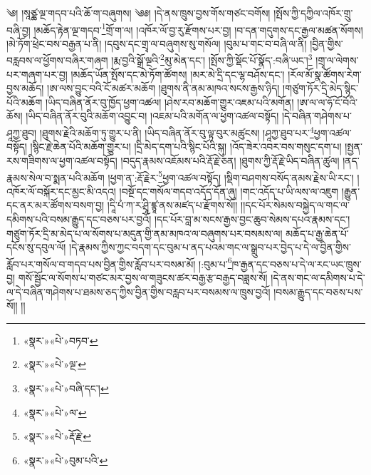 ༄། །སཱཙྪ་ལྔ་གདབ་པའི་ཆོ་ག་བཞུགས། ༄༅། །དེ་ནས་ཁྲུས་བྱས་གོས་གཙང་བགོས། །སྤོས་ཀྱི་དཀྱིལ་འཁོར་གྲུ་བཞི་བྱ། །མཆོད་རྟེན་ལྔ་གདབ་\footnote{«སྣར་»«པེ་»བཏབ་}གྲོ་ག་ལ། །འཁོར་ལོ་བྱ་རུ་རྫོགས་པར་བྱ། །བ་དན་གདུགས་དང་རྒྱལ་མཚན་སོགས། །མེ་ཏོག་ཕྲེང་བས་བརྒྱན་པ་ནི། །དབུས་དང་གྲྭ་ལ་བཞུགས་སུ་གསོལ། །བུམ་པ་གང་བ་བཞི་ལ་ནི། །བྱིན་གྱིས་བརླབས་ལ་ཕྱོགས་བཞིར་གཞག །རྨ་བྱའི་སྒྲོ་ལྔའི་\footnote{«སྣར་»«པེ་»ལྔ་}མུ་མེན་དང་། །སྤོས་ཀྱི་སྡོང་པོ་སྣོད་:བཞི་ཡང་།\footnote{«སྣར་»«པེ་»བཞི་དང་།} །གྲྭ་ལ་ལེགས་པར་གཞག་པར་བྱ། །མཆོད་ཡོན་སྤོས་དང་མེ་ཏོག་ཚོགས། །མར་མེ་དྲི་དང་ལྷ་བཤོས་དང་། །རོལ་མོ་སྣ་ཚོགས་རེག་བྱས་མཆོད། །ཨ་ལས་བྱུང་བའི་ངོ་མཚར་མཆོག །ཐུགས་ནི་ནམ་མཁའ་སངས་རྒྱས་ཉིད། །གཙུག་ཏོར་དྲི་མེད་སྙིང་པོའི་མཆོག །ཡིད་བཞིན་ནོར་བུ་ཁྱོད་ཕྱག་འཚལ། །ཤེས་རབ་མཆོག་གྱུར་འཇམ་པའི་མགོན། །ཨ་ལ་ལ་ཧོ་ངོ་བོའི་ཆོས། །ཡིད་བཞིན་ནོར་བུའི་མཆོག་འབྱུང་བ། །འཇམ་པའི་མགོན་ལ་ཕྱག་འཚལ་བསྟོད། །དེ་བཞིན་གཤེགས་པ་ཤཱཀྱ་ཐུབ། །ཐུགས་རྗེའི་མཆོག་ཏུ་གྱུར་པ་ནི། །ཡིད་བཞིན་ནོར་བུ་ལྟ་བུར་མཚུངས། །ཤཱཀྱ་ཐུབ་པར་\footnote{«སྣར་»«པེ་»ལ་}ཕྱག་འཚལ་བསྟོད། །སྙིང་རྗེ་ཆེན་པོའི་མཆོག་གྱུར་པ། །དྲི་མེད་དག་པའི་སྙིང་པོའི་སྐུ། །འོད་ཟེར་འབར་བས་གསུང་དག་པ། །སྤྱན་རས་གཟིགས་ལ་ཕྱག་འཚལ་བསྟོད། །བདུད་རྣམས་འཇོམས་པའི་རྡོ་རྗེ་ཅན། །ཐུགས་ཀྱི་རྡོ་རྗེ་ཡིད་བཞིན་ཚུལ། །ནད་རྣམས་སེལ་བ་སྨན་པའི་མཆོག །ཕྱག་ན་:རྡོ་རྗེར་\footnote{«སྣར་»«པེ་»རྡོ་རྗེ་}ཕྱག་འཚལ་བསྟོད། །སྡིག་བཤགས་བསོད་ནམས་རྗེས་ཡི་རང་། །འཁོར་ལོ་བསྐོར་དང་མྱང་མི་འདའ། །བསྔོ་དང་གསོལ་གདབ་འདོད་དོན་ཞུ། །གང་འདོད་པ་ཡི་ལས་ལ་འཇུག །རྒྱུན་དང་ནར་མར་ཚོགས་བསག་བྱ། །དཱི་པཾ་ཀ་ར་ཤྲཱི་ཛྙཱ་ནས་མཛད་པ་རྫོགས་སོ།། །།དང་པོར་སེམས་བསྐྱེད་ལ་གང་ལ་དམིགས་པའི་བསམ་རྒྱུད་དང་བཅས་པར་བྱའོ། །དང་པོར་བླ་མ་སངས་རྒྱས་བྱང་ཆུབ་སེམས་དཔའ་རྣམས་དང་། གཙུག་ཏོར་དྲི་མ་མེད་པ་ལ་སོགས་པ་མདུན་གྱི་ནམ་མཁའ་ལ་བཞུགས་པར་བསམས་ལ། མཆོད་པ་རྒྱ་ཆེན་པོ་དངོས་སུ་དབུལ་ལོ། །དེ་རྣམས་ཀྱིས་ཀྱང་བདག་དང་བུམ་པ་ནད་པའམ་གང་ལ་སྒྲུབ་པར་བྱེད་པ་དེ་ལ་བྱིན་གྱིས་རློབ་པར་གསོལ་བ་གདབ་པས་བྱིན་གྱིས་རློབ་པར་བསམ་མོ། །:བུམ་པ་\footnote{«སྣར་»«པེ་»བུམ་པའི་}ཁ་རྒྱན་དང་བཅས་པ་དེ་ལ་རང་ཡང་ཁྲུས་བྱ། གསོ་སྦྱོང་ལ་སོགས་པ་གཙང་མར་བྱས་ལ་གཟུངས་ཚར་བརྒྱ་རྩ་བརྒྱད་བཟླས་སོ། །དེ་ནས་གང་ལ་དམིགས་པ་དེ་ལ་དེ་བཞིན་གཤེགས་པ་ཐམས་ཅད་ཀྱིས་བྱིན་གྱིས་བརླབ་པར་བསམས་ལ་ཁྲུས་བྱའོ། །བསམ་རྒྱུད་དང་བཅས་པས་སོ།། །།